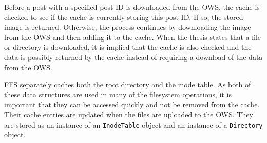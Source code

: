 Before a post with a specified post ID is downloaded from the \gls{OWS}, the cache is checked to see if the cache is currently storing this post ID. If so, the stored image is returned. Otherwise, the process continues by downloading the image from the \gls{OWS} and then adding it to the cache. When the thesis states that a file or directory is downloaded, it is implied that the cache is also checked and the data is possibly returned by the cache instead of requiring a download of the data from the \gls{OWS}.

\gls{FFS} separately caches both the root directory and the inode table. As both of these data structures are used in many of the filesystem operations, it is important that they can be accessed quickly and not be removed from the cache. Their cache entries are updated when the files are uploaded to the \gls{OWS}. They are stored as an instance of an \texttt{InodeTable} object and an instance of a \texttt{Directory} object.

